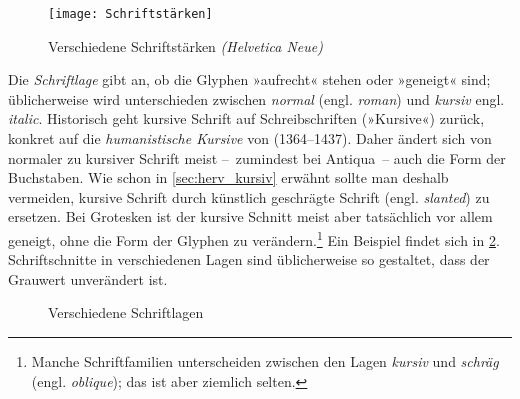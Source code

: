 \begin{figure}
  \centering
  \texttt{[image: Schriftstärken]}
  \caption{Verschiedene Schriftstärken \emph{(Helvetica Neue)}}
  \label{fig:Schriftstärken}
\end{figure}

Die \emph{Schriftlage} gibt an, ob die Glyphen »aufrecht« stehen oder
»geneigt« sind; üblicherweise wird unterschieden zwischen
\emph{normal} (engl. \emph{\foreignlanguage{british}{roman}}) und
\emph{kursiv} engl. \emph{\foreignlanguage{british}{italic}}.
Historisch geht kursive Schrift auf Schreibschriften (»Kursive«)
zurück, konkret auf die \emph{humanistische Kursive} von  (1364--1437).  Daher ändert sich von normaler zu
kursiver Schrift meist --~zumindest bei Antiqua~-- auch die Form der
Buchstaben.  Wie schon in \cref{sec:herv_kursiv} erwähnt sollte man
deshalb vermeiden, kursive Schrift durch künstlich geschrägte Schrift
(engl. \emph{\foreignlanguage{british}{slanted}}) zu ersetzen.  Bei
Grotesken ist der kursive Schnitt meist aber tatsächlich vor allem
geneigt, ohne die Form der Glyphen zu verändern.\footnote{Manche
  Schriftfamilien unterscheiden zwischen den Lagen \emph{kursiv} und
  \emph{schräg} (engl. \emph{\foreignlanguage{british}{oblique}}); das
  ist aber ziemlich selten.}  Ein Beispiel findet sich in
\cref{fig:Schriftlagen}.  Schriftschnitte in verschiedenen Lagen sind
üblicherweise so gestaltet, dass der Grauwert unverändert ist.

\begin{figure}
  \centering

  \hspace{.1\textwidth}

  \caption{Verschiedene Schriftlagen}
  \label{fig:Schriftlagen}
\end{figure}


